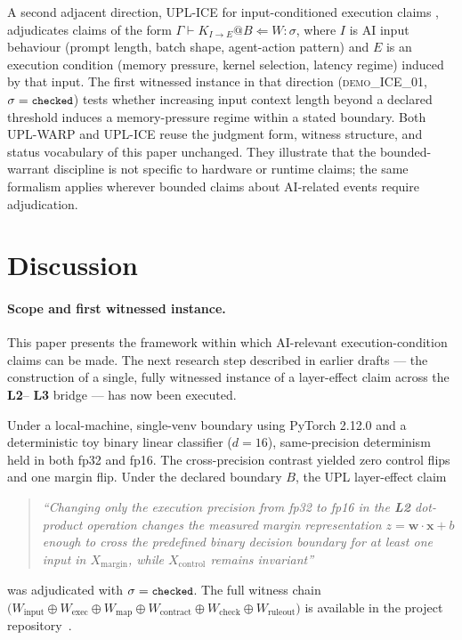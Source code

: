 \documentclass[11pt, a4paper]{article}
\theoremstyle{upldef}
\newcommand{\witness}[1]{\ensuremath{W_{\text{#1}}}}
\newcommand{\layer}[1]{\textbf{L#1}}
\newcommand{\statuslabel}[1]{\texttt{\small #1}}
\begin{document}
A second adjacent direction, UPL-ICE for input-conditioned execution
claims \citep{vasen2026ice}, adjudicates claims of the form
$\Gamma \vdash K_{I \to E} @ B \Leftarrow W : \sigma$, where $I$ is
AI input behaviour (prompt length, batch shape, agent-action pattern)
and $E$ is an execution condition (memory pressure, kernel
selection, latency regime) induced by that input. The first
witnessed instance in that direction (\textsc{demo\_ICE\_01},
$\sigma = \statuslabel{checked}$) tests whether increasing input
context length beyond a declared threshold induces a memory-pressure
regime within a stated boundary. Both UPL-WARP and UPL-ICE reuse the
judgment form, witness structure, and status vocabulary of this
paper unchanged. They illustrate that the bounded-warrant discipline
is not specific to hardware or runtime claims; the same formalism
applies wherever bounded claims about AI-related events require
adjudication.

\section{Discussion}
\label{sec:discussion}

\paragraph{Scope and first witnessed instance.}
This paper presents the framework within which AI-relevant
execution-condition claims can be made. The next research step
described in earlier drafts --- the construction of a single, fully
witnessed instance of a layer-effect claim across the \layer{2}--
\layer{3} bridge --- has now been executed.

Under a local-machine, single-venv boundary using PyTorch 2.12.0
and a deterministic toy binary linear classifier ($d = 16$),
same-precision determinism held in both fp32 and fp16. The
cross-precision contrast yielded zero control flips and one margin
flip. Under the declared boundary $B$, the UPL layer-effect claim
\begin{quote}\itshape\small
``Changing only the execution precision from fp32 to fp16 in the
\layer{2} dot-product operation changes the measured margin
representation $z = \mathbf{w}\cdot\mathbf{x} + b$ enough to cross
the predefined binary decision boundary for at least one input in
$X_{\mathrm{margin}}$, while $X_{\mathrm{control}}$ remains
invariant''
\end{quote}
was adjudicated with $\sigma = \statuslabel{checked}$. The full
witness chain
$\bigl(\witness{input} \oplus \witness{exec} \oplus
\witness{map} \oplus \witness{contract} \oplus \witness{check}
\oplus \witness{ruleout}\bigr)$
is available in the project repository~\cite{vasen2026demo06}.
\end{document}
